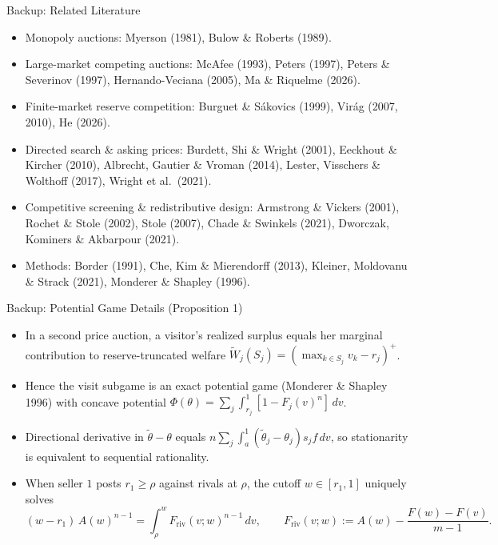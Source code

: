 \documentclass[11pt,aspectratio=169]{beamer}
\def\meditem{\smallskip\item}
\begin{document}
\begin{frame}[noframenumbering]{Backup: Related Literature}
\begin{itemize}
\item \alert{Monopoly auctions}: Myerson (1981), Bulow \& Roberts (1989).
\meditem \alert{Large-market competing auctions}: McAfee (1993), Peters (1997), Peters \& Severinov (1997), Hernando-Veciana (2005), Ma \& Riquelme (2026).
\meditem \alert{Finite-market reserve competition}: Burguet \& S\'akovics (1999), Vir\'ag (2007, 2010), He (2026).
\meditem \alert{Directed search \& asking prices}: Burdett, Shi \& Wright (2001), Eeckhout \& Kircher (2010), Albrecht, Gautier \& Vroman (2014), Lester, Visschers \& Wolthoff (2017), Wright et al.\ (2021).
\meditem \alert{Competitive screening \& redistributive design}: Armstrong \& Vickers (2001), Rochet \& Stole (2002), Stole (2007), Chade \& Swinkels (2021), Dworczak, Kominers \& Akbarpour (2021).
\meditem \alert{Methods}: Border (1991), Che, Kim \& Mierendorff (2013), Kleiner, Moldovanu \& Strack (2021), Monderer \& Shapley (1996).
\end{itemize}
\end{frame}

\begin{frame}[noframenumbering]{Backup: Potential Game Details (Proposition 1)}
\begin{itemize}
\item In a second price auction, a visitor's realized surplus equals her marginal contribution to reserve-truncated welfare $\widetilde W_j(S_j)=(\max_{k\in S_j}v_k-r_j)^+$.
\meditem Hence the visit subgame is an exact potential game (Monderer \& Shapley 1996) with concave potential $\Phi(\theta)=\sum_j\int_{r_j}^1[1-F_j(v)^n]\,dv$.
\meditem Directional derivative in $\tilde\theta-\theta$ equals $n\sum_j\int_a^1(\tilde\theta_j-\theta_j)s_j f\,dv$, so stationarity is equivalent to sequential rationality.
\meditem When seller $1$ posts $r_1\ge\rho$ against rivals at $\rho$, the cutoff $w\in[r_1,1]$ uniquely solves
\[
(w-r_1)\,A(w)^{n-1} = \int_\rho^w F_{\mathrm{riv}}(v;w)^{n-1}\,dv, \qquad F_{\mathrm{riv}}(v;w):=A(w)-\frac{F(w)-F(v)}{m-1}.
\]
\end{itemize}
\end{frame}
\end{document}
